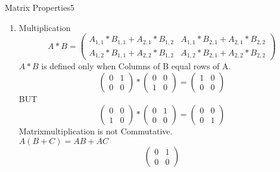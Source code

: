 \begin{questions}
	
	\begin{question}{Matrix Properties}{5}		
	\begin{answer} 
	\begin{enumerate}
		\item  Multiplication
	\begin{equation*} 
		A*B = 
		\begin{pmatrix}
			A_{1,1}*B_{1,1}+A_{2,1}*B_{1,2} & A_{1,1}*B_{2,1}+A_{2,1}*B_{2,2} \\
			A_{1,2}*B_{1,1}+A_{2,2}*B_{1,2} & A_{1,2}*B_{2,1}+A_{2,2}*B_{2,2}
		\end{pmatrix}
	\end{equation*}
	$A*B$ is defined only when Columns of B equal rows of A.\\
	\begin{equation*} 
		\begin{pmatrix}
			0 & 1 \\
			0 & 0
		\end{pmatrix}
		*
		\begin{pmatrix}
			0 & 0 \\
			1 & 0
		\end{pmatrix} 
		= 
		\begin{pmatrix}
			1 & 0 \\
			0 & 0
		\end{pmatrix}
	\end{equation*}
	BUT\\
	\begin{equation*} 
	\begin{pmatrix}
		0 & 0 \\
		1 & 0
	\end{pmatrix} 
	*
	\begin{pmatrix}
		0 & 1 \\
		0 & 0
	\end{pmatrix}
	= 
	\begin{pmatrix}
		0 & 0 \\
		0 & 1
	\end{pmatrix}
	\end{equation*}
	Matrixmultiplication is not Commutative.\\
	$A(B+C) = AB + AC$
	\begin{equation*} 
		\begin{pmatrix} %
			0 & 1 \\	%
			0 & 0
		\end{pmatrix} 

\end{equation*}
\end{enumerate}
\end{answer}
\end{question}
\end{questions}
